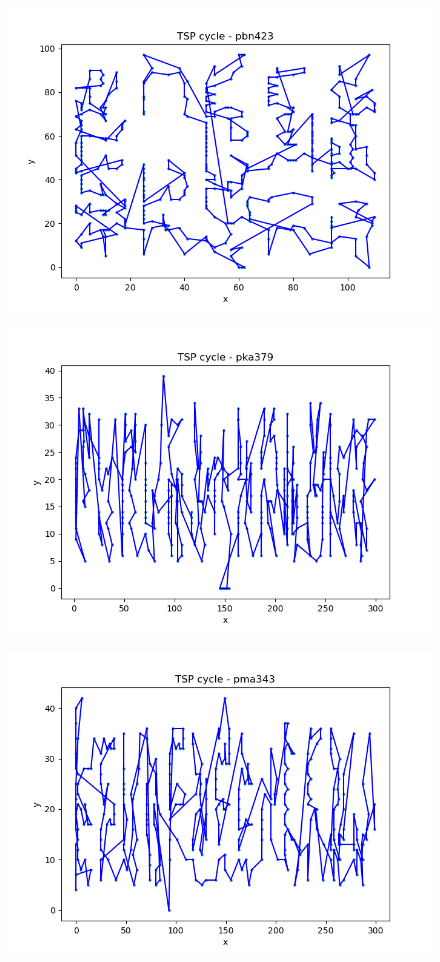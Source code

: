 \documentclass[12pt]{article}
\begin{document}
\begin{figure}[h]
    \centering
    \includegraphics[width=0.8\linewidth]{img/pbn423.png}
    \label{fig:pbn423}
\end{figure}

\begin{figure}[h]
    \centering
    \includegraphics[width=0.8\linewidth]{img/pka379.png}
    \label{fig:pka379}
\end{figure}

\begin{figure}[h]
    \centering
    \includegraphics[width=0.8\linewidth]{img/pma343.png}
    \label{fig:pma343}
\end{figure}
\end{document}
